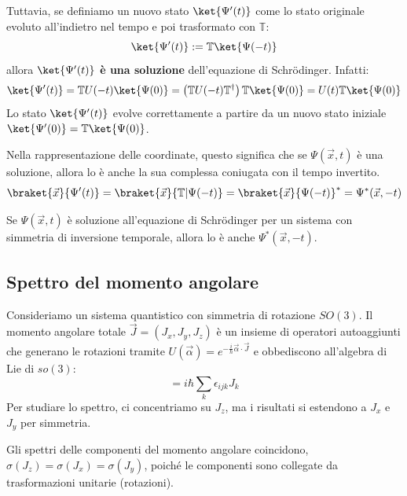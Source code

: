 Tuttavia, se definiamo un nuovo stato \(\ket{\Psi'(t)}\) come lo stato originale evoluto all'indietro nel tempo e poi trasformato con \(\mathbb{T}\):
\[
    \ket{\Psi'(t)} := \mathbb{T}\ket{\Psi(-t)}
\]
allora \(\ket{\Psi'(t)}\) \textbf{è una soluzione} dell'equazione di Schrödinger.
Infatti:
\[
    \ket{\Psi'(t)} = \mathbb{T} U(-t) \ket{\Psi(0)} = \left( \mathbb{T} U(-t) \mathbb{T}^\dagger \right) \mathbb{T}\ket{\Psi(0)} = U(t) \mathbb{T}\ket{\Psi(0)}
\]
Lo stato \(\ket{\Psi'(t)}\) evolve correttamente a partire da un nuovo stato iniziale \(\ket{\Psi'(0)} = \mathbb{T}\ket{\Psi(0)}\).

Nella rappresentazione delle coordinate, questo significa che se \(\Psi(\vec{x}, t)\) è una soluzione, allora lo è anche la sua complessa coniugata con il tempo invertito.
\[
    \braket{\vec{x}}{\Psi'(t)} = \braket{\vec{x}}{\mathbb{T} | \Psi(-t)} = \braket{\vec{x}}{\Psi(-t)}^* = \Psi^*(\vec{x}, -t)
\]

Se \(\Psi(\vec{x}, t)\) è soluzione all'equazione di Schrödinger per un sistema con simmetria di inversione temporale, allora lo è anche \(\Psi^*(\vec{x}, -t)\).



\subsection{Spettro del momento angolare}
Consideriamo un sistema quantistico con simmetria di rotazione \(SO(3)\).
Il momento angolare totale \(\vec{J} = (J_x, J_y, J_z)\) è un insieme di operatori autoaggiunti che generano le rotazioni tramite \(U(\vec{\alpha}) = e^{-\frac{i}{\hbar}\vec{\alpha} \cdot \vec{J}}\)
e obbediscono all'algebra di Lie di \(so(3)\):
\begin{equation}
    [J_i, J_j] = i\hbar \sum_k \epsilon_{ijk} J_k
\end{equation}
Per studiare lo spettro, ci concentriamo su \(J_z\), ma i risultati si estendono a \(J_x\) e \(J_y\) per simmetria.
\begin{remark}
    Gli spettri delle componenti del momento angolare coincidono, \(\sigma(J_z) = \sigma(J_x) = \sigma(J_y)\),
    poiché le componenti sono collegate da trasformazioni unitarie (rotazioni).
\end{remark}

